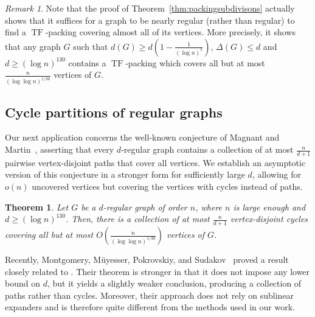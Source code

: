 \documentclass[10pt]{article}
\theoremstyle{plain}
\newtheorem{theorem}{Theorem}
\numberwithin{theorem}{section}
\theoremstyle{definition}
\theoremstyle{remark}
\newtheorem*{rem}{Remark}
\DeclareMathOperator{\TF}{TF}
\theoremstyle{plain}
\begin{document}
	\begin{rem}
		Note that the proof of Theorem~\ref{thm:packingsubdivisons} actually shows that it suffices for a graph to be nearly regular (rather than regular) to find a $\TF$-packing covering almost all of its vertices. More precisely, it shows that 
		any graph $G$ such that $d(G) \ge d(1 -\frac{1}{(\log n)^{5}})$, $\Delta(G) \le d$ and $d \ge (\log n)^{130}$ contains a $\TF$-packing which covers all but at most $\frac{n}{(\log \log n)^{1/30}}$ vertices of $G$. 
	\end{rem}

\subsection{Cycle partitions of regular graphs}
\label{subsec:cyclepartitions}

Our next application concerns the well-known conjecture of Magnant and Martin~\cite{magnant2009note}, asserting that every $d$-regular graph contains a collection of at most $\frac{n}{d+1}$ pairwise vertex-disjoint paths that cover all vertices. We establish an asymptotic version of this conjecture in a stronger form for sufficiently large $d$, allowing for $o(n)$ uncovered vertices but covering the vertices with cycles instead of paths.


\begin{theorem} \label{thm:cycle-partition}
	Let $G$ be a $d$-regular graph of order $n$, where $n$ is large enough and $d \ge (\log n)^{130}$.
	Then, there is a collection of at most $\frac{n}{d+1}$ vertex-disjoint cycles covering all but at most $O\left(\frac{n}{(\log \log n)^{1/30}}\right)$ vertices of $G$.
\end{theorem}

Recently, Montgomery, M\"uyesser, Pokrovskiy, and Sudakov~\cite{montgomery2024approximate} proved a result closely related to . 
Their theorem is stronger in that it does not impose any lower bound on $d$, 
but it yields a slightly weaker conclusion, producing a collection of paths rather than cycles. 
Moreover, their approach does not rely on sublinear expanders and is therefore quite different from the methods used in our work.
\end{document}
